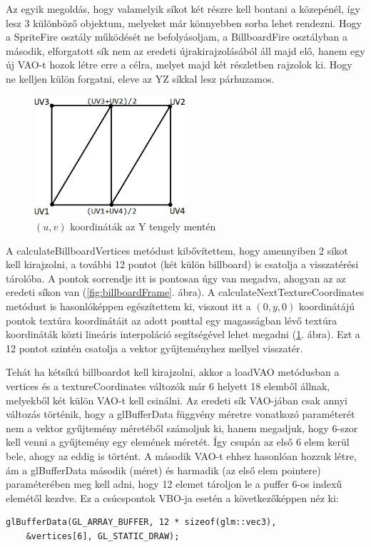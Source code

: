 Az egyik megoldás, hogy valamelyik síkot két részre kell bontani a közepénél, így lesz 3 különböző objektum, melyeket már könnyebben sorba lehet rendezni. Hogy a SpriteFire osztály működését ne befolyásoljam, a BillboardFire osztályban a második, elforgatott sík nem az eredeti újrakirajzolásából áll majd elő, hanem egy új VAO-t hozok létre erre a célra, melyet majd két részletben rajzolok ki. Hogy ne kelljen külön forgatni, eleve az YZ síkkal lesz párhuzamos. 

\begin{figure}[h]
 \centering
 \includegraphics[width=0.5\textwidth]{kepek/billboardUVcoords.png}
 \caption{$(u, v)$ koordináták az Y tengely mentén}
 \label{fig:billboardUVcoords}
\end{figure}

A calculateBillboardVertices metódust kibővítettem, hogy amennyiben 2 síkot kell kirajzolni, a további 12 pontot (két külön billboard) is csatolja a visszatérési tárolóba. A pontok sorrendje itt is pontosan úgy van megadva, ahogyan az az eredeti síkon van (\ref{fig:billboardFrame}. ábra). A calculateNextTextureCoordinates metódust is hasonlóképpen egészítettem ki, viszont itt a $(0, y, 0)$ koordinátájú pontok textúra koordinátáit az adott ponttal egy magasságban lévő textúra koordináták közti lineáris interpoláció segítségével lehet megadni (\ref{fig:billboardUVcoords}. ábra). Ezt a 12 pontot szintén csatolja a vektor gyűjteményhez mellyel visszatér.

Tehát ha kétsíkú billboardot kell kirajzolni, akkor a loadVAO metódusban a vertices és a textureCoordinates változók már 6 helyett 18 elemből állnak, melyekből két külön VAO-t kell csinálni. Az eredeti sík VAO-jában csak annyi változás történik, hogy a glBufferData függvény méretre vonatkozó paraméterét nem a vektor gyűjtemény méretéből számoljuk ki, hanem megadjuk, hogy 6-szor kell venni a gyűjtemény egy elemének méretét. Így csupán az első 6 elem kerül bele, ahogy az eddig is történt. A második VAO-t ehhez hasonlóan hozzuk létre, ám a glBufferData második (méret) és harmadik (az első elem pointere) paraméterében meg kell adni, hogy 12 elemet tároljon le a puffer 6-os indexű elemétől kezdve. Ez a csúcspontok VBO-ja esetén a következőképpen néz ki:
\begin{lstlisting}
glBufferData(GL_ARRAY_BUFFER, 12 * sizeof(glm::vec3), 
	&vertices[6], GL_STATIC_DRAW);
\end{lstlisting}

